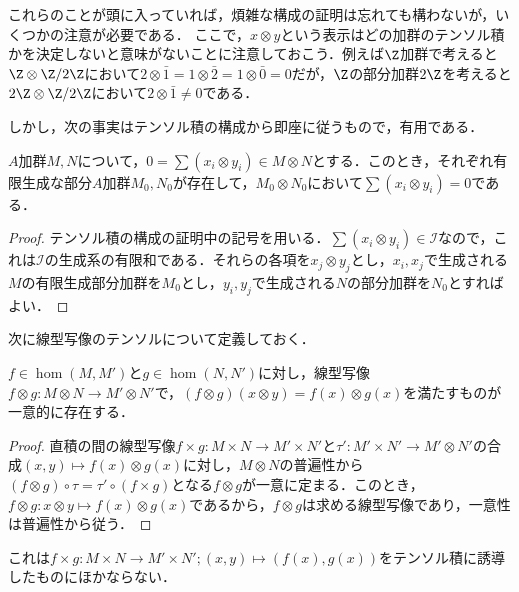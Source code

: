 これらのことが頭に入っていれば，煩雑な構成の証明は忘れても構わないが，いくつかの注意が必要である．
ここで，$x\otimes y$という表示はどの加群のテンソル積かを決定しないと意味がないことに注意しておこう．例えば$\Z$加群で考えると $\Z\otimes \Z/2\Z$において$2\otimes\bar{1}=1\otimes\bar{2}=1\otimes\bar{0}=0$だが，$\Z$の部分加群$2\Z$を考えると$2\Z\otimes\Z/2\Z$において$2\otimes\bar{1}\neq0$である．

しかし，次の事実はテンソル積の構成から即座に従うもので，有用である．

\begin{prop}\label{prop:テンソルの有限生成への制限}
	$A$加群$M,N$について，$0=\sum (x_i\otimes y_i)\in M\otimes N$とする．このとき，それぞれ有限生成な部分$A$加群$M_0,N_0$が存在して，$M_0\otimes N_0$において$\sum (x_i\otimes y_i)=0$である．
\end{prop}

\begin{proof}
	テンソル積の構成の証明中の記号を用いる．$\sum (x_i\otimes y_i)\in\mathcal{I}$なので，これは$\mathcal{I}$の生成系の有限和である．それらの各項を$x_j\otimes y_j$とし，$x_i,x_j$で生成される$M$の有限生成部分加群を$M_0$とし，$y_i,y_j$で生成される$N$の部分加群を$N_0$とすればよい．
\end{proof}

次に線型写像のテンソルについて定義しておく．

\begin{prop}
	$f\in\hom(M,M')$と$g\in\hom(N,N')$に対し，線型写像$f\otimes g:M\otimes N\to M'\otimes N'$で，$(f\otimes g)(x\otimes y)=f(x)\otimes g(x)$を満たすものが一意的に存在する．
\end{prop}
\begin{proof}
	直積の間の線型写像$f\times g:M\times N\to M'\times N'$と$\tau':M'\times N'\to M'\otimes N'$の合成$(x,y)\mapsto f(x)\otimes g(x)$に対し，$M\otimes N$の普遍性から$(f\otimes g)\circ\tau=\tau'\circ(f\times g)$となる$f\otimes g$が一意に定まる．このとき，$f\otimes g:x\otimes y\mapsto f(x)\otimes g(x)$であるから，$f\otimes g$は求める線型写像であり，一意性は普遍性から従う．
\end{proof}
これは$f\times g:M\times N\to M'\times N';(x,y)\mapsto (f(x),g(x))$をテンソル積に誘導したものにほかならない．

